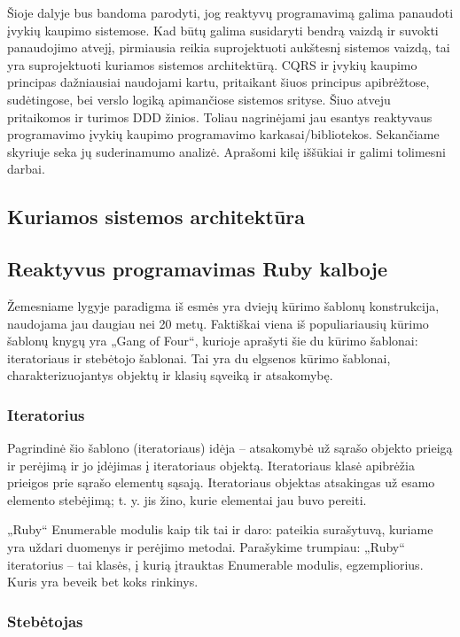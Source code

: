   Šioje dalyje bus bandoma parodyti, jog reaktyvų programavimą galima panaudoti įvykių kaupimo sistemose. Kad būtų galima susidaryti bendrą vaizdą ir suvokti panaudojimo atvejį, pirmiausia reikia suprojektuoti aukštesnį sistemos vaizdą, tai yra suprojektuoti kuriamos sistemos architektūrą. CQRS ir įvykių kaupimo principas dažniausiai naudojami kartu, pritaikant šiuos principus apibrėžtose, sudėtingose, bei verslo logiką apimančiose sistemos srityse. Šiuo atveju pritaikomos ir turimos DDD žinios. Toliau nagrinėjami jau esantys reaktyvaus programavimo įvykių kaupimo programavimo karkasai/bibliotekos. Sekančiame skyriuje seka jų suderinamumo analizė. Aprašomi kilę iššūkiai ir galimi tolimesni darbai.

\subsection{Kuriamos sistemos architektūra}

\subsection{Reaktyvus programavimas Ruby kalboje}

Žemesniame lygyje paradigma iš esmės yra dviejų kūrimo šablonų konstrukcija, naudojama jau daugiau nei 20 metų. Faktiškai viena iš populiariausių kūrimo šablonų knygų yra „Gang of Four“, kurioje aprašyti šie du kūrimo šablonai: iteratoriaus ir stebėtojo šablonai. Tai yra du elgsenos kūrimo šablonai, charakterizuojantys objektų ir klasių sąveiką ir atsakomybę.

\subsubsection{Iteratorius}

Pagrindinė šio šablono (iteratoriaus) idėja – atsakomybė už sąrašo objekto prieigą ir perėjimą ir jo įdėjimas į iteratoriaus objektą. Iteratoriaus klasė apibrėžia prieigos prie sąrašo elementų sąsają. Iteratoriaus objektas atsakingas už esamo elemento stebėjimą; t. y. jis žino, kurie elementai jau buvo pereiti. \cite{GOF:DesignPattern}

„Ruby“ Enumerable modulis kaip tik tai ir daro: pateikia surašytuvą, kuriame yra uždari duomenys ir perėjimo metodai. Parašykime trumpiau: „Ruby“ iteratorius – tai klasės, į kurią įtrauktas Enumerable modulis, egzempliorius. Kuris yra beveik bet koks rinkinys.

\subsubsection{Stebėtojas}

